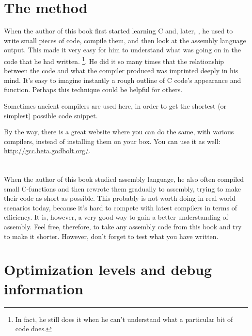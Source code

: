 \section{The method}

When the author of this book first started learning C and, later, \Cpp, he used to write small pieces of code, compile them,
and then look at the assembly language output. This made it very easy for him to understand what was going on in the code that he had written.
\footnote{In fact, he still does it when he can't understand what a particular bit of code does.}.
He did it so many times that the relationship between the \CCpp code and what the compiler produced was imprinted deeply in his mind.
It's easy to imagine instantly a rough outline of C code's appearance and function.
Perhaps this technique could be helpful for others.


Sometimes ancient compilers are used here, in order to get the shortest (or simplest) possible code snippet.

By the way, there is a great website where you can do the same, with various compilers, instead of installing them on your box.
You can use it as well: \url{http://gcc.beta.godbolt.org/}.

\section*{\Exercises}

When the author of this book studied assembly language, he also often compiled small C-functions and then rewrote
them gradually to assembly, trying to make their code as short as possible.
This probably is not worth doing in real-world scenarios today,
because it's hard to compete with latest compilers in terms of efficiency. It is, however, a very good way to gain a better understanding of assembly.
Feel free, therefore, to take any assembly code from this book and try to make it shorter.
However, don't forget to test what you have written.

\section*{Optimization levels and debug information}

